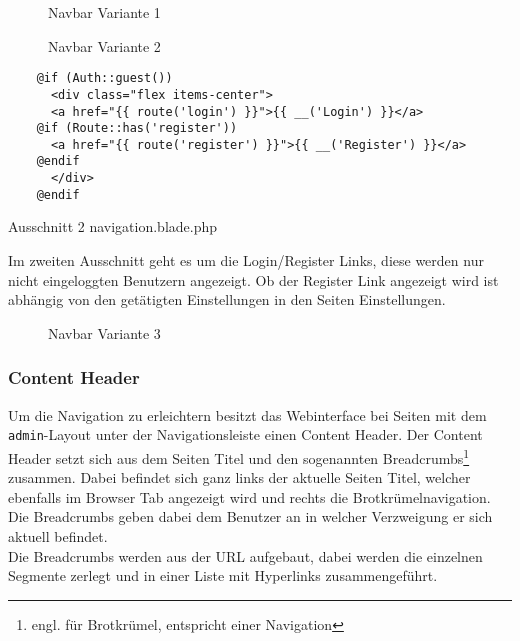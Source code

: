 \begin{figure}[H]
  \centering
  \caption{Navbar Variante 1}
\end{figure}

\begin{figure}[H]
  \centering
  \caption{Navbar Variante 2}
\end{figure}

\begin{listing}[H]
  \begin{verbatim}
    @if (Auth::guest())
      <div class="flex items-center">
      <a href="{{ route('login') }}">{{ __('Login') }}</a>
    @if (Route::has('register'))
      <a href="{{ route('register') }}">{{ __('Register') }}</a>
    @endif
      </div>
    @endif
  \end{verbatim}
  \caption{Ausschnitt 2 navigation.blade.php}
\end{listing}

Im zweiten Ausschnitt geht es um die Login/Register Links, diese werden nur
nicht eingeloggten Benutzern angezeigt. Ob der Register Link angezeigt wird ist
abhängig von den getätigten Einstellungen in den Seiten Einstellungen.

\begin{figure}[H]
  \centering
  \caption{Navbar Variante 3}
\end{figure}

\subsubsection{Content Header}
Um die Navigation zu erleichtern besitzt das Webinterface bei Seiten mit dem
\verb|admin|-Layout unter der Navigationsleiste einen Content Header. Der
Content Header setzt sich aus dem Seiten Titel und den sogenannten Breadcrumbs\footnote{engl.
für Brotkrümel, entspricht einer Navigation} zusammen. Dabei befindet sich ganz
links der aktuelle Seiten Titel, welcher ebenfalls im Browser Tab angezeigt wird
und rechts die Brotkrümelnavigation. Die Breadcrumbs geben dabei dem Benutzer an
in welcher Verzweigung er sich aktuell befindet.\\

Die Breadcrumbs werden aus der URL aufgebaut, dabei werden die einzelnen
Segmente zerlegt und in einer Liste mit Hyperlinks zusammengeführt.  

